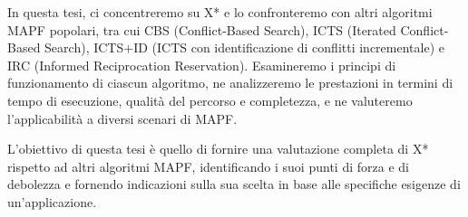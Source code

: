 \documentclass{article}
\begin{document}
In questa tesi, ci concentreremo su X* e lo confronteremo con altri algoritmi MAPF popolari, tra cui CBS (Conflict-Based Search), ICTS (Iterated Conflict-Based Search), ICTS+ID (ICTS con identificazione di conflitti incrementale) e IRC (Informed Reciprocation Reservation). Esamineremo i principi di funzionamento di ciascun algoritmo, ne analizzeremo le prestazioni in termini di tempo di esecuzione, qualità del percorso e completezza, e ne valuteremo l'applicabilità a diversi scenari di MAPF.

L'obiettivo di questa tesi è quello di fornire una valutazione completa di X* rispetto ad altri algoritmi MAPF, identificando i suoi punti di forza e di debolezza e fornendo indicazioni sulla sua scelta in base alle specifiche esigenze di un'applicazione.
\end{document}

